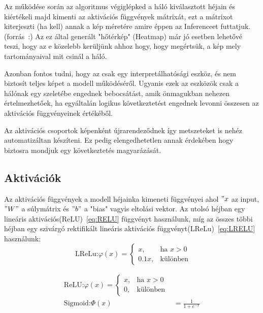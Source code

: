 \documentclass[12pt,oneside,a4paper]{article}
\theoremstyle{remark}
\begin{document}
    Az  működése során az algoritmus végiglépked a háló kiválasztott héjain és kiértékeli majd kimenti az aktivációs függvények mátrixát, ezt a mátrixot kiterjeszti (ha kell) annak a kép méretére amire éppen az \gls{Inference}et futtatjuk. (forrás~\cite{muhammad2020eigencam}:)
    Az ez által generált "hőtérkép" (Heatmap) már jó esetben lehetővé teszi, hogy az e közelebb kerüljünk ahhoz hogy, hogy megértsük, a kép mely tartományaival mit csinál a háló.

     Azonban fontos tudni, hogy az  csak egy interpretálhatósági eszköz, és nem biztosít teljes képet
     a modell működéséről.
     Ugyanis ezek az eszközök csak a hálónak egy szeletébe engednek bebocsátást, amik önmagukban nehezen értelmezhetőek, ha egyáltalán logikus következtetést engednek levonni összesen az aktivációs függvényeinek értékéből.

     Az aktivációs csoportok képenként újrarendeződnek így metszeteket is nehéz automatizáltan készíteni. Ez pedig elengedhetetlen annak érdekében hogy biztosra mondjuk egy következtetés magyarázását.

\subsection{Aktivációk}\label{subsec:activations}
Az aktivációs függvények a modell héjainka kimeneti függvényei ahol \("x\) az input, \("W"\) a súlymátrix és \("b"\) a
    "bias" vagyis eltolási vektor.
        Az utolsó héjban egy lineáris aktivációs(\ac{ReLU})~\eqref{eq:RELU}\label{alignhivatkozas} függvényt használunk, míg az összes többi héjban egy
    szivárgó rektifikált lineáris aktivációs függvényt(\ac{LReLu})~\eqref{eq:LRELU}\label{eqhivatkozas} használunk:
    \begin{equation}
        \text{ LReLu:}
    \varphi(x) = \begin{cases}
      x, & \text{ha } x > 0 \\
      0.1x, & \text{különben}
    \end{cases}\label{eq:LRELU}
    \end{equation}\label{eq:activation_functions}


    \begin{align}
    \text{ReLU:}
    \varphi(x)=\begin{cases}
      x, & \text{ha } x > 0 \\
      0, & \text{különben} \end{cases}\label{eq:RELU} \\
    \text{Sigmoid:}
    \varPhi(x) &= \frac{1}{1 + e^{-x}} \label{eq:Sigmoid}
    \end{align}
\end{document}
